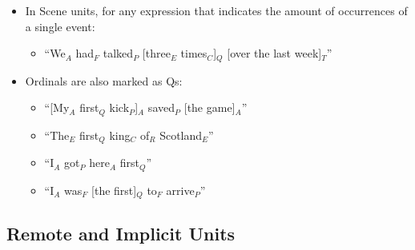 \documentclass[11pt]{article}
\begin{document}
\begin{enumerate}
\begin{itemize}
\item In Scene units, for any expression that indicates the amount of occurrences of a single event:

\begin{itemize}
\item
``We$_A$ had$_F$ talked$_P$ [three$_E$ times$_C$]$_Q$ [over the last week]$_T$''
\end{itemize}
 
\item Ordinals are also marked as Qs:

\begin{itemize}
\item
``[My$_A$ first$_Q$ kick$_P$]$_A$ saved$_P$ [the game]$_A$''
\item
``The$_E$ first$_Q$ king$_C$ of$_R$ Scotland$_E$''
\item
``I$_A$ got$_P$ here$_A$ first$_Q$''
\item
``I$_A$ was$_F$ [the first]$_Q$ to$_F$ arrive$_P$''
\end{itemize}
\end{itemize}

\end{enumerate}


\subsection*{Remote and Implicit Units}
\end{document}
